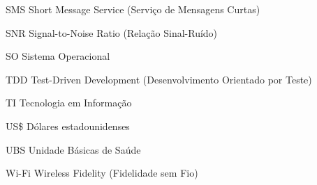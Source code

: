 \begin{siglas}
  \item[SMS]    Short Message Service (Serviço de Mensagens Curtas)
  \item[SNR]    Signal-to-Noise Ratio (Relação Sinal-Ruído)
  \item[SO]     Sistema Operacional
  \item[TDD]    Test-Driven Development (Desenvolvimento Orientado por Teste)
  \item[TI]     Tecnologia em Informação
  \item[US\$]   Dólares estadounidenses
  \item[UBS]    Unidade Básicas de Saúde
  \item[Wi-Fi]  Wireless Fidelity (Fidelidade sem Fio)
\end{siglas}